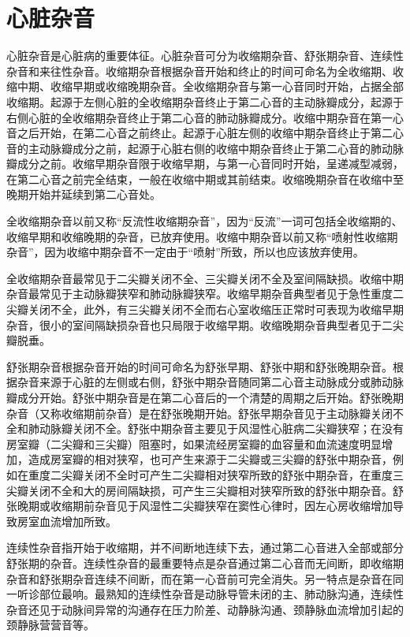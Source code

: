 \chapter{心脏杂音}

心脏杂音是心脏病的重要体征。心脏杂音可分为收缩期杂音、舒张期杂音、连续性杂音和来往性杂音。收缩期杂音根据杂音开始和终止的时间可命名为全收缩期、收缩中期、收缩早期或收缩晚期杂音。全收缩期杂音与第一心音同时开始，占据全部收缩期。起源于左侧心脏的全收缩期杂音终止于第二心音的主动脉瓣成分，起源于右侧心脏的全收缩期杂音终止于第二心音的肺动脉瓣成分。收缩中期杂音在第一心音之后开始，在第二心音之前终止。起源于心脏左侧的收缩中期杂音终止于第二心音的主动脉瓣成分之前，起源于心脏右侧的收缩中期杂音终止于第二心音的肺动脉瓣成分之前。收缩早期杂音限于收缩早期，与第一心音同时开始，呈递减型减弱，在第二心音之前完全结束，一般在收缩中期或其前结束。收缩晚期杂音在收缩中至晚期开始并延续到第二心音处。

全收缩期杂音以前又称“反流性收缩期杂音”，因为“反流”一词可包括全收缩期的、收缩早期和收缩晚期的杂音，已放弃使用。收缩中期杂音以前又称“喷射性收缩期杂音”，因为收缩中期杂音不一定由于“喷射”所致，所以也应该放弃使用。

全收缩期杂音最常见于二尖瓣关闭不全、三尖瓣关闭不全及室间隔缺损。收缩中期杂音最常见于主动脉瓣狭窄和肺动脉瓣狭窄。收缩早期杂音典型者见于急性重度二尖瓣关闭不全，此外，有三尖瓣关闭不全而右心室收缩压正常时可表现为收缩早期杂音，很小的室间隔缺损杂音也只局限于收缩早期。收缩晚期杂音典型者见于二尖瓣脱垂。

舒张期杂音根据杂音开始的时间可命名为舒张早期、舒张中期和舒张晚期杂音。根据杂音来源于心脏的左侧或右侧，舒张中期杂音随同第二心音主动脉成分或肺动脉瓣成分开始。舒张中期杂音是在第二心音后的一个清楚的周期之后开始。舒张晚期杂音（又称收缩期前杂音）是在舒张晚期开始。舒张早期杂音见于主动脉瓣关闭不全和肺动脉瓣关闭不全。舒张中期杂音主要见于风湿性心脏病二尖瓣狭窄；在没有房室瓣（二尖瓣和三尖瓣）阻塞时，如果流经房室瓣的血容量和血流速度明显增加，造成房室瓣的相对狭窄，也可产生来源于二尖瓣或三尖瓣的舒张中期杂音，例如在重度二尖瓣关闭不全时可产生二尖瓣相对狭窄所致的舒张中期杂音，在重度三尖瓣关闭不全和大的房间隔缺损，可产生三尖瓣相对狭窄所致的舒张中期杂音。舒张晚期或收缩期前杂音见于风湿性二尖瓣狭窄在窦性心律时，因左心房收缩增加导致房室血流增加所致。

连续性杂音指开始于收缩期，并不间断地连续下去，通过第二心音进入全部或部分舒张期的杂音。连续性杂音的最重要特点是杂音通过第二心音而无间断，即收缩期杂音和舒张期杂音连续不间断，而在第一心音前可完全消失。另一特点是杂音在同一听诊部位最响。最熟知的连续性杂音是动脉导管未闭的主、肺动脉沟通，连续性杂音还见于动脉间异常的沟通存在压力阶差、动静脉沟通、颈静脉血流增加引起的颈静脉营营音等。

